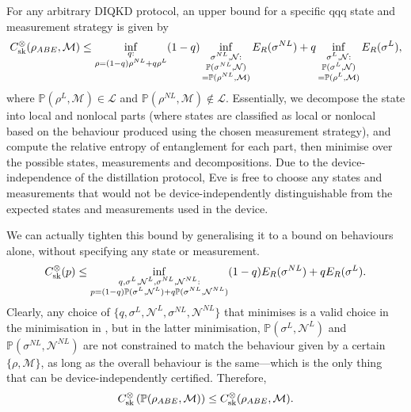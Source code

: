 \documentclass[10pt, a4paper]{article}
\numberwithin{equation}{section} %
\theoremstyle{definition}
\theoremstyle{plain}
\newcommand{\?}{\mathrel{?}} %
\newcommand{\sM}{\mathcal{M}}
\newcommand{\sN}{\mathcal{N}}
\newcommand{\cP}{\mathbb{P}}
\newcommand{\Ls}{\mathcal{L}}
\newcommand{\sk}{\rm sk}
\begin{document}
      For any arbitrary DIQKD protocol, an upper bound for a specific qqq state and measurement strategy is given by~\cite[Thm. 3]{CCSquashedEntangle}
      \begin{equation}\label{eqn:genubound_state}
        C^{\otimes}_{\sk}(\rho_{ABE}, \sM) \leq \inf_{\substack{q : \\ \rho = (1-q)\rho^{NL} + q\rho^L}} (1-q) \inf_{\substack{\sigma^{NL}, \sN : \\ \cP(\sigma^{NL}, \sN) \\ = \cP(\rho^{NL}, \sM) }} E_R(\sigma^{NL}) + q \inf_{\substack{\sigma^L, \sN : \\ \cP(\sigma^L, \sN) \\ = \cP(\rho^L, \sM) }} E_R(\sigma^L),
      \end{equation}
      where \(\cP(\rho^L, \sM) \in \Ls\) and \(\cP(\rho^{NL}, \sM) \not\in \Ls\). Essentially, we decompose the state into local and nonlocal parts (where states are classified as local or nonlocal based on the behaviour produced using the chosen measurement strategy), and compute the relative entropy of entanglement for each part, then minimise over the possible states, measurements and decompositions. Due to the device-independence of the distillation protocol, Eve is free to choose any states and measurements that would not be device-independently distinguishable from the expected states and measurements used in the device.

      We can actually tighten this bound by generalising it to a bound on behaviours alone, without specifying any state or measurement.
      \begin{equation}\label{eqn:genubound_behav}
        C^{\otimes}_{\sk}(p) \leq \inf_{\substack{q, \sigma^{L}, \sN^{L}, \sigma^{NL}, \sN^{NL} : \\ p = (1-q)\cP(\sigma^{L}, \sN^{L}) + q\cP(\sigma^{NL}, \sN^{NL})}} (1-q) E_R(\sigma^{NL}) + q E_R(\sigma^L).
      \end{equation}
      Clearly, any choice of \(\{q, \sigma^{L}, \sN^{L}, \sigma^{NL}, \sN^{NL}\}\) that minimises  is a valid choice in the minimisation in , but in the latter minimisation, \(\cP(\sigma^{L}, \sN^{L})\) and \(\cP(\sigma^{NL}, \sN^{NL})\) are not constrained to match the behaviour given by a certain \(\{\rho, \sM\}\), as long as the overall behaviour is the same---which is the only thing that can be device-independently certified. Therefore,
      \begin{equation}
         C^{\otimes}_{\sk}\left( \cP(\rho_{ABE}, \sM) \right) \leq C^{\otimes}_{\sk}(\rho_{ABE}, \sM).
      \end{equation}
\end{document}
